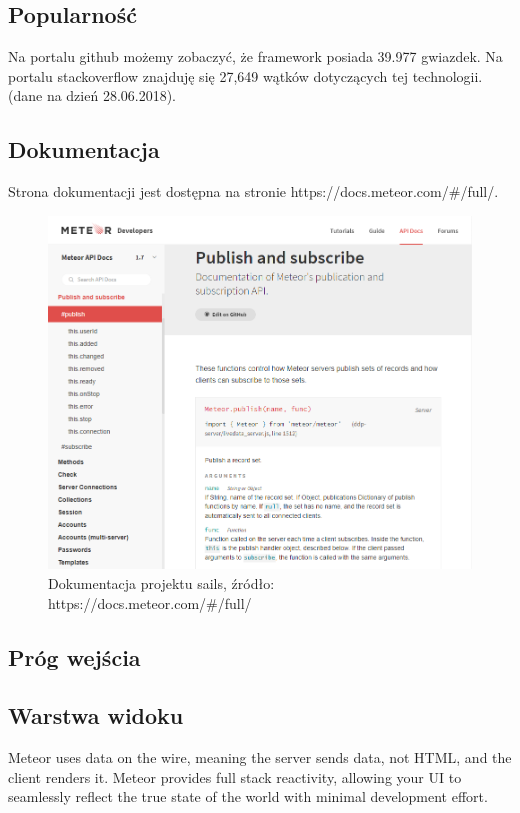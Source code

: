 \documentclass[12pt]{report}
\begin{document}
    \subsection{Popularność}
      Na portalu github możemy zobaczyć, że framework posiada 39.977 gwiazdek.
      Na portalu stackoverflow znajduję się 27,649 wątków dotyczących tej technologii.
      (dane na dzień 28.06.2018).

    \subsection{Dokumentacja}
      Strona dokumentacji jest dostępna na stronie https://docs.meteor.com/\#/full/.
      \begin{figure}[!hb]
        \centering
        \includegraphics[width=\textwidth,height=\textheight,keepaspectratio]{doc_meteor.png} 
        \caption{Dokumentacja projektu sails, źródło: https://docs.meteor.com/\#/full/}
      \end{figure}

    \subsection{Próg wejścia}
    \subsection{Warstwa widoku}
      Meteor uses data on the wire, meaning the server sends data, not HTML, and the client renders it.
      Meteor provides full stack reactivity, allowing your UI to seamlessly reflect the true state of the world with minimal development effort.
\end{document}
